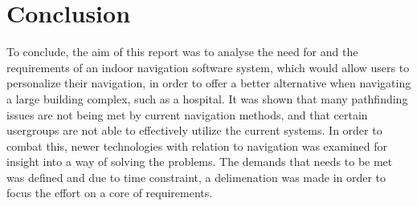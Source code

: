\chapter{Conclusion}

To conclude, the aim of this report was to analyse the need for and the requirements of an indoor navigation software system, which would allow users to personalize their navigation, in order to offer a better alternative when navigating a large building complex, such as a hospital. It was shown that many pathfinding issues are not being met by current navigation methods, and that certain usergroups are not able to effectively utilize the current systems. In order to combat this, newer technologies with relation to navigation was examined for insight into a way of solving the problems. The demands that needs to be met was defined and due to time constraint, a delimenation was made in order to focus the effort on a core of requirements.